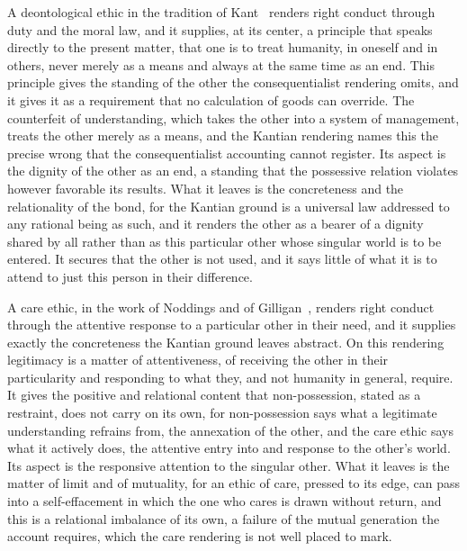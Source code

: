 A deontological ethic in the tradition of Kant~\parencite{kant1785groundwork} renders right conduct through duty and the moral law, and it supplies, at its center, a principle that speaks directly to the present matter, that one is to treat humanity, in oneself and in others, never merely as a means and always at the same time as an end. This principle gives the standing of the other the consequentialist rendering omits, and it gives it as a requirement that no calculation of goods can override. The counterfeit of understanding, which takes the other into a system of management, treats the other merely as a means, and the Kantian rendering names this the precise wrong that the consequentialist accounting cannot register. Its aspect is the dignity of the other as an end, a standing that the possessive relation violates however favorable its results. What it leaves is the concreteness and the relationality of the bond, for the Kantian ground is a universal law addressed to any rational being as such, and it renders the other as a bearer of a dignity shared by all rather than as this particular other whose singular world is to be entered. It secures that the other is not used, and it says little of what it is to attend to just this person in their difference.

A care ethic, in the work of Noddings and of Gilligan~\parencite{noddings1984caring,gilligan1982voice}, renders right conduct through the attentive response to a particular other in their need, and it supplies exactly the concreteness the Kantian ground leaves abstract. On this rendering legitimacy is a matter of attentiveness, of receiving the other in their particularity and responding to what they, and not humanity in general, require. It gives the positive and relational content that non-possession, stated as a restraint, does not carry on its own, for non-possession says what a legitimate understanding refrains from, the annexation of the other, and the care ethic says what it actively does, the attentive entry into and response to the other's world. Its aspect is the responsive attention to the singular other. What it leaves is the matter of limit and of mutuality, for an ethic of care, pressed to its edge, can pass into a self-effacement in which the one who cares is drawn without return, and this is a relational imbalance of its own, a failure of the mutual generation the account requires, which the care rendering is not well placed to mark.

